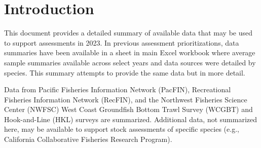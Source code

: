 \documentclass[11pt,
  english,
  letterpaper,
]{article}
\begin{document}
\pagebreak
{}
\setcounter{page}{1}

\renewcommand{\thetable}{\roman{table}}
\renewcommand{\thefigure}{\roman{figure}}

\setlength\parskip{0.5em plus 0.1em minus 0.2em}

\pagebreak
\setlength{\parskip}{5mm plus1mm minus1mm}
\setcounter{page}{1}
\renewcommand{\thefigure}{\arabic{figure}}
\renewcommand{\thetable}{\arabic{table}}
\setcounter{table}{0}
\setcounter{figure}{0}


\hypertarget{introduction}{%
\section{Introduction}\label{introduction}}

\leavevmode\tagmcend\tagstructend


This document provides a detailed summary of available data that may be used to support assessments in 2023. In previous assessment prioritizations, data summaries have been available in a sheet in main Excel workbook where average sample summaries available across select years and data sources were detailed by species. This summary attempts to provide the same data but in more detail.

\leavevmode\tagmcend\tagstructend\par


Data from Pacific Fisheries Information Network (PacFIN), Recreational Fisheries Information Network (RecFIN), and the Northwest Fisheries Science Center (NWFSC) West Coast Groundfish Bottom Trawl Survey (WCGBT) and Hook-and-Line (HKL) surveys are summarized. Additional data, not summarized here, may be available to support stock assessments of specific species (e.g., California Collaborative Fisheries Research Program).

\leavevmode\tagmcend\tagstructend\par

\end{document}
